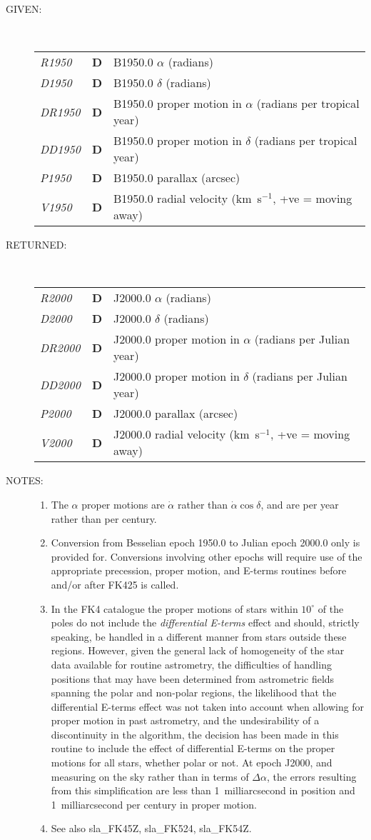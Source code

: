 \documentclass[11pt,twoside]{article}
\newlength{\oldspacing}
\newcommand{\args}[2]
{
  \goodbreak
  \setlength{\oldspacing}{\topsep}
  \setlength{\topsep}{0.3ex}
  \begin{description}
  \item[#1]:\\[1.5ex]
    \begin{tabular}{p{7em}p{6em}p{22em}}
      #2
    \end{tabular}
  \end{description}
  \setlength{\topsep}{\oldspacing}
}
\renewcommand{\args}[2]
   {
     \begin{description}
        \item[#1:]\\
        \begin{tabular}{p{7em}p{6em}l}
           #2
        \end{tabular}
     \end{description}
   }
\newcommand{\spec}[3]
{
  {\em {#1}} & {\bf \mbox{#2}} & {#3}
}
\newcommand{\notes}[1]
{
  \goodbreak
  \setlength{\oldspacing}{\topsep}
  \setlength{\topsep}{0.3ex}
  \begin{description}
    \item[NOTES]:
        #1
  \end{description}
  \setlength{\topsep}{\oldspacing}
}
\renewcommand{\notes}[1]
   {
      \begin{description}
         \item[NOTES:]
            #1
      \end{description}
   }
\begin{document}
\args{GIVEN}
{
 \spec{R1950}{D}{B1950.0 $\alpha$ (radians)} \\
 \spec{D1950}{D}{B1950.0 $\delta$ (radians)} \\
 \spec{DR1950}{D}{B1950.0 proper motion in $\alpha$
                              (radians per tropical year)} \\
 \spec{DD1950}{D}{B1950.0 proper motion in $\delta$
                              (radians per tropical year)} \\
 \spec{P1950}{D}{B1950.0 parallax (arcsec)} \\
 \spec{V1950}{D}{B1950.0 radial velocity (km~s$^{-1}$, +ve = moving away)}
}
\args{RETURNED}
{
 \spec{R2000}{D}{J2000.0 $\alpha$ (radians)} \\
 \spec{D2000}{D}{J2000.0 $\delta$ (radians)} \\
 \spec{DR2000}{D}{J2000.0 proper motion in $\alpha$
                              (radians per Julian year)} \\
 \spec{DD2000}{D}{J2000.0 proper motion in $\delta$
                              (radians per Julian year)} \\
 \spec{P2000}{D}{J2000.0 parallax (arcsec)} \\
 \spec{V2000}{D}{J2000.0 radial velocity (km~s$^{-1}$, +ve = moving away)}
}
\notes
{
 \begin{enumerate}
  \item The $\alpha$ proper motions are $\dot{\alpha}$ rather than
        $\dot{\alpha}\cos\delta$, and are per year rather than per century.
  \item Conversion from Besselian epoch 1950.0 to Julian epoch
        2000.0 only is provided for.  Conversions involving other
        epochs will require use of the appropriate precession,
        proper motion, and E-terms routines before and/or after FK425
        is called.
  \item In the FK4 catalogue the proper motions of stars within
        $10^{\circ}$ of the poles do not include the {\it differential
        E-terms}\/ effect and should, strictly speaking, be handled
        in a different manner from stars outside these regions.
        However, given the general lack of homogeneity of the star
        data available for routine astrometry, the difficulties of
        handling positions that may have been determined from
        astrometric fields spanning the polar and non-polar regions,
        the likelihood that the differential E-terms effect was not
        taken into account when allowing for proper motion in past
        astrometry, and the undesirability of a discontinuity in
        the algorithm, the decision has been made in this routine to
        include the effect of differential E-terms on the proper
        motions for all stars, whether polar or not.  At epoch J2000,
        and measuring on the sky rather than in terms of $\Delta\alpha$,
        the errors resulting from this simplification are less than
        1~milliarcsecond in position and 1~milliarcsecond per
        century in proper motion.
  \item See also sla\_FK45Z, sla\_FK524, sla\_FK54Z.
 \end{enumerate}
}
\end{document}
